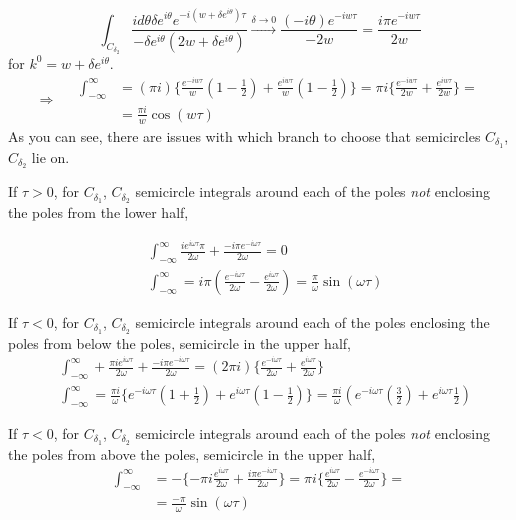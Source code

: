 \documentclass[twoside]{amsart}
\begin{document}
\[
\int_{C_{\delta_2 } } \frac{ i d\theta \delta e^{i \theta} e^{-i (w + \delta e^{i \theta}  ) \tau } }{ -\delta e^{i \theta} (2 w + \delta e^{i \theta}  )} \xrightarrow{ \delta \to 0} \frac{ (-i\theta) e^{-iw\tau }}{ -2w } = \frac{ i \pi e^{-iw\tau} }{2w }
\]
for $k^0 = w + \delta e^{i \theta}$.  
\[
\Longrightarrow \quad \, \begin{aligned} \int_{-\infty}^{\infty} & = (\pi i) \lbrace \frac{ e^{-iw \tau }}{w} \left( 1 - \frac{1}{2} \right) + \frac{ e^{iw \tau}}{ w} \left( 1 - \frac{1}{2} \right) \rbrace = \pi i \lbrace \frac{ e^{- iw\tau } }{2w} + \frac{ e^{i w \tau }}{ 2w } \rbrace = \\
  & = \frac{ \pi i }{w} \cos{(w \tau )}
\end{aligned}
\]
As you can see, there are issues with which branch to choose that semicircles $C_{\delta_1}$, $C_{\delta_2}$ lie on.  

If $\tau > 0$, for $C_{\delta_1}$, $C_{\delta_2}$ semicircle integrals around each of the poles \emph{not} enclosing the poles from the lower half, 

\[
\begin{aligned}
  & \int_{-\infty}^{\infty} \frac{ ie^{i \omega \tau} \pi}{ 2 \omega } + \frac{ - i \pi e^{-i \omega \tau} }{ 2 \omega} = 0 \\
  & \int_{-\infty}^{\infty} = i \pi \left( \frac{ e^{-i \omega \tau} }{2\omega } - \frac{ e^{i\omega \tau}}{2\omega } \right) = \frac{ \pi}{ \omega } \sin{(\omega \tau )}
\end{aligned}
\]

If $\tau < 0$, for $C_{\delta_1}$, $C_{\delta_2}$ semicircle integrals around each of the poles enclosing the poles from below the poles, semicircle in the upper half,
\[
\begin{aligned}
  & \int_{-\infty}^{\infty} + \frac{ \pi i e^{i \omega \tau} }{ 2 \omega } + \frac{ -i \pi e^{-i \omega \tau }}{ 2\omega } = (2\pi i ) \lbrace \frac{ e^{-i \omega \tau } }{2\omega} + \frac{ e^{ i \omega \tau}}{2\omega } \rbrace \\ 
  &  \int_{-\infty}^{\infty} = \frac{ \pi i }{\omega} \lbrace e^{-i \omega \tau} \left( 1 + \frac{1}{2} \right) + e^{i \omega \tau} \left( 1 - \frac{1}{2} \right) \rbrace = \frac{ \pi i }{\omega} ( e^{-i\omega \tau} \left( \frac{3}{2} \right) + e^{i \omega \tau} \frac{1}{2} )
\end{aligned}
\]

If $\tau < 0$, for $C_{\delta_1}$, $C_{\delta_2}$ semicircle integrals around each of the poles \emph{not} enclosing the poles from above the poles, semicircle in the upper half,
\[
\begin{aligned}
  \int_{-\infty}^{\infty} & = - \lbrace -\pi i \frac{ e^{i\omega \tau}}{2 \omega} + \frac{ i \pi e^{-i \omega \tau}}{2\omega} \rbrace = \pi i \lbrace \frac{ e^{i \omega \tau}}{2\omega} - \frac{ e^{-i\omega \tau}}{2\omega} \rbrace = \\
  & = \frac{-\pi}{\omega} \sin{(\omega \tau)}
\end{aligned}
\]
\end{document}
